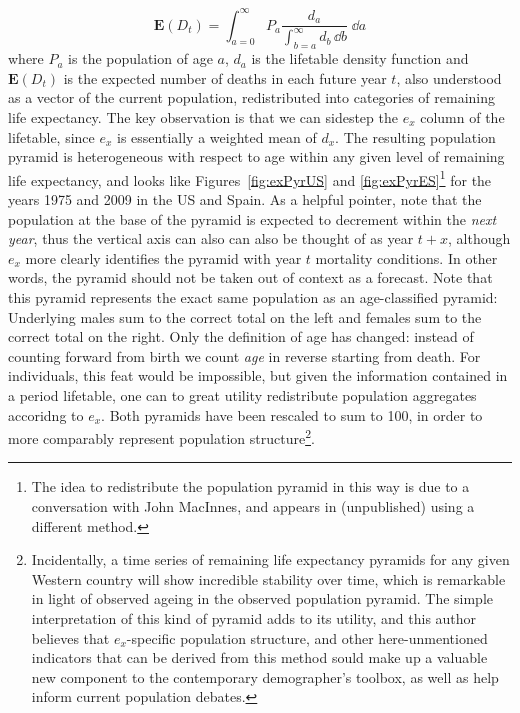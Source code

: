 \begin{equation}
\mathbf{E}(D_t) = \int _{a = 0} ^{\infty} P_a \frac{d_a}{\int _{b = a} ^{\infty}
d_b\, \dd b} \;\dd a
\end{equation}
where $P_a$ is the population of age $a$, $d_a$ is the
lifetable density function and $\mathbf{E}(D_t)$ is the expected number of
deaths in each future year $t$, also understood as a vector of the current 
population, redistributed into categories of remaining life expectancy. The key
observation is that we can sidestep the $e_x$ column of the lifetable, since
$e_x$ is essentially a weighted mean of $d_x$. The resulting population pyramid
is heterogeneous with respect to age within any given level of remaining life
expectancy, and looks like
Figures~\ref{fig:exPyrUS} and \ref{fig:exPyrES}\footnote{The idea to
redistribute the population pyramid in this way is due to a conversation with 
John MacInnes, and appears in \citep{MacInnes2013pop} (unpublished) using a
different method.} for the years 1975 and 2009 in the US and Spain. As a helpful
pointer, note that the population at the base of the pyramid is expected to decrement
within the \textit{next year}, thus the vertical axis can also can also be
thought of as year $t+x$, although $e_x$ more clearly identifies the pyramid
with year $t$ mortality conditions. In other words, the pyramid should not be
taken out of context as a forecast. Note that this pyramid represents the
exact same population as an age-classified pyramid: Underlying males sum to the
correct total on the left and females sum to the correct total on the right. Only the definition of age has
changed: instead of counting forward from birth we count \textit{age} in reverse
starting from death. For individuals, this feat would be impossible, but given
 the information contained in a period lifetable,  one can to great utility 
 redistribute population aggregates accoridng to $e_x$.
Both pyramids have been rescaled to sum to 100, in order to more comparably represent population 
structure\footnote{Incidentally, a time series of remaining life expectancy 
pyramids for any given Western country will show incredible stability over time, 
which is remarkable in light of observed ageing in the observed population pyramid. 
The simple interpretation of this kind of pyramid adds to its utility, and this author 
believes that $e_x$-specific population structure, and other here-unmentioned indicators 
that can be derived from this method sould make up a valuable new component to the contemporary
 demographer's toolbox, as well as help inform current population debates.}.

